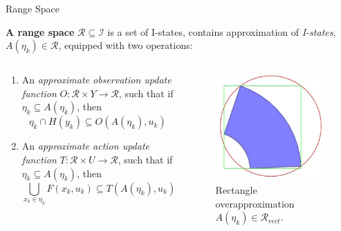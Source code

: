 \begin{frame}{Range Space}
\begin{definition}{\textbf{A range space}}
 $\mathcal{R} \subseteq \mathcal{I}$ is a set of I-states, contains
 approximation of \emph{I-states}, $A(\eta_k) \in \mathcal{R}$, equipped with
 two operations:
\end{definition}
\begin{columns}
\begin{column}{.5\textwidth}
\begin{enumerate}
\item An \emph{approximate observation update function} $O: \mathcal{R} \times
		Y \to \mathcal{R}$, such that if $\eta_k \subseteq A(\eta_k)$, then
			$$\eta_k \cap H(y_k) \subseteq O(A(\eta_k), u_k)$$
\item An \emph{approximate action update function} $T: \mathcal{R} \times U \to
		\mathcal{R}$, such that if $\eta_k \subseteq A(\eta_k)$, then
			$$\bigcup_{x_k \in \eta_k} F(x_k, u_k) \subseteq T(A(\eta_k), u_k)$$
\end{enumerate}
\end{column}
\begin{column}{.4\textwidth}
  \begin{figure}
    \includegraphics[scale=0.3]{figs/rangespace.jpg}
    \caption{Rectangle overapproximation $A(\eta_k) \in \mathcal{R}_{rect}$.}
  \end{figure}
\end{column}
\end{columns}
\end{frame}


